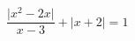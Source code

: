 \begin{ex}[type=equation]
	\begin{condition}
		$\dfrac{\big|x^2 -2x\big|}{x - 3}+ \big|x+ 2\big|= 1$
	\end{condition}
\end{ex}